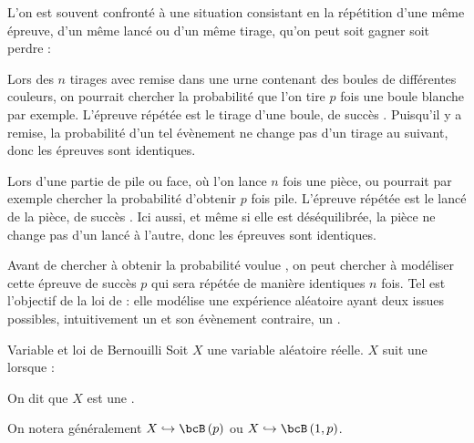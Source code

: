 \documentclass[a4paper,french,bookmarks]{article}
\begin{document}
    L'on est souvent confronté à une situation consistant en la répétition d'une même épreuve, d'un même lancé ou d'un même tirage, qu'on peut soit gagner soit perdre :
    \begin{enumerate}
        \itt Lors des $n$ tirages avec remise dans une urne contenant des boules de différentes couleurs, on pourrait chercher la probabilité que l'on tire $p$ fois une boule blanche par exemple. L'épreuve répétée est le tirage d'une boule, de succès . Puisqu'il y a remise, la probabilité d'un tel évènement ne change pas d'un tirage au suivant, donc les épreuves sont identiques.
        
        \itt Lors d'une partie de pile ou face, où l'on lance $n$ fois une pièce, ou pourrait par exemple chercher la probabilité d'obtenir $p$ fois pile. L'épreuve répétée est le lancé de la pièce, de succès . Ici aussi, et même si elle est déséquilibrée, la pièce ne change pas d'un lancé à l'autre, donc les épreuves sont identiques.
    \end{enumerate}
    Avant de chercher à obtenir la probabilité voulue , on peut chercher à modéliser cette épreuve de succès $p$ qui sera répétée de manière identiques $n$ fois. Tel est l'objectif de la loi de \Bernoulli{} : elle modélise une expérience aléatoire ayant deux issues possibles, intuitivement un  et son évènement contraire, un .
    
    \begin{definition}{Variable et loi de Bernouilli}{}
        Soit $X$ une variable aléatoire réelle. $X$ suit une \hg{loi de \Bernoulli{} de paramètre $p \in \left]0, 1\right[$} lorsque :
        \begin{enumerate}
            \ithand {}
            \ithand {}
        \end{enumerate}
        On dit que $X$ est une .
    \end{definition}
    On notera généralement $X \hookrightarrow \bcB\left(p\right)$ ou $X \hookrightarrow \bcB\left(1, p\right)$. 
    
\end{document}
